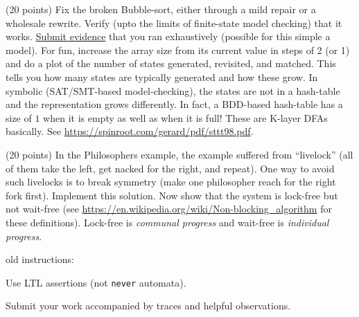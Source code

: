 \documentclass[11pt]{article}
\begin{document}
\begin{enumerate}

\item (20 points) Fix the broken Bubble-sort, either through
  a mild repair or a wholesale rewrite.
  Verify (upto the limits of finite-state model checking) that
  it works.
  \underline{Submit evidence} that you ran exhaustively (possible for this simple a model).
    For fun, increase the array size from its current value in steps of 2 (or 1) and do a plot
    of the number of states generated, revisited, and matched. This tells you how many
    states are typically generated and how these grow. In symbolic (SAT/SMT-based model-checking),
    the states are not in a hash-table and the representation grows differently. In fact, a
    BDD-based hash-table has a size of $1$ when it is empty as well as when it is full!
    These are K-layer DFAs basically. See \url{https://spinroot.com/gerard/pdf/sttt98.pdf}.
  
\begin{minipage}{\minpagw}
\end{minipage}

\clearpage

\item (20 points) In the Philosophers example, the example suffered
  from
  ``livelock'' (all of them take the left, get nacked for the right,
  and repeat).
  One way to avoid such livelocks is to break symmetry (make one philosopher
  reach for the right fork first).
  Implement this solution.
  Now show that the system is lock-free but not wait-free
  (see \url{https://en.wikipedia.org/wiki/Non-blocking_algorithm}
  for these definitions).
  Lock-free is {\em communal progress}
  and
  wait-free is {\em individual progress}.
  \begin{compactitem}
  \item old instructions:
    \begin{scriptsize}
      \begin{compactitem}
      \item  Use LTL assertions (not {\tt never} automata).

      \item  Submit your work accompanied by traces and helpful observations.
      \end{compactitem}
     

\end{scriptsize}
\end{compactitem}
\end{enumerate}
\end{document}
